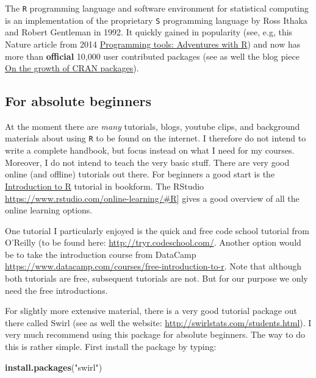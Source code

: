 \documentclass[]{article}
\newenvironment{Shaded}{\begin{snugshade}}{\end{snugshade}}
\newcommand{\KeywordTok}[1]{\textcolor[rgb]{0.13,0.29,0.53}{\textbf{#1}}}
\newcommand{\StringTok}[1]{\textcolor[rgb]{0.31,0.60,0.02}{#1}}
\newcommand{\NormalTok}[1]{#1}
\theoremstyle{definition}
\theoremstyle{definition}
\theoremstyle{definition}
\theoremstyle{remark}
\begin{document}
The \texttt{R} programming language and software environment for
statistical computing is an implementation of the proprietary \texttt{S}
programming language by Ross Ithaka and Robert Gentleman in 1992. It
quickly gained in popularity (see, e.g, this Nature article from 2014
\href{http://www.nature.com/news/programming-tools-adventures-with-r-1.16609}{Programming
tools: Adventures with R}) and now has more than \textbf{official}
10,000 user contributed packages (see as well the blog piece
\href{https://www.r-bloggers.com/on-the-growth-of-cran-packages/}{On the
growth of CRAN packages}).

\subsection{For absolute beginners}\label{for-absolute-beginners}

At the moment there are \emph{many} tutorials, blogs, youtube clips, and
background materials about using \texttt{R} to be found on the internet.
I therefore do not intend to write a complete handbook, but focus
instead on what I need for my courses. Moreover, I do not intend to
teach the very basic stuff. There are very good online (and offline)
tutorials out there. For beginners a good start is the
\href{http://colinfay.me/intro-to-r/}{Introduction to R} tutorial in
bookform. The RStudio
\url{https://www.rstudio.com/online-learning/\#R}{]} gives a good
overview of all the online learning options.

One tutorial I particularly enjoyed is the quick and free code school
tutorial from O'Reilly (to be found here:
\url{http://tryr.codeschool.com/}. Another option would be to take the
introduction course from DataCamp
\url{https://www.datacamp.com/courses/free-introduction-to-r}. Note that
although both tutorials are free, subsequent tutorials are not. But for
our purpose we only need the free introductions.

For slightly more extensive material, there is a very good tutorial
package out there called Swirl (see as well the website:
\url{http://swirlstats.com/students.html}). I very much recommend using
this package for absolute beginners. The way to do this is rather
simple. First install the package by typing:

\begin{Shaded}
\begin{Highlighting}[]
\KeywordTok{install.packages}\NormalTok{(}\StringTok{"swirl"}\NormalTok{)}
\end{Highlighting}
\end{Shaded}
\end{document}
